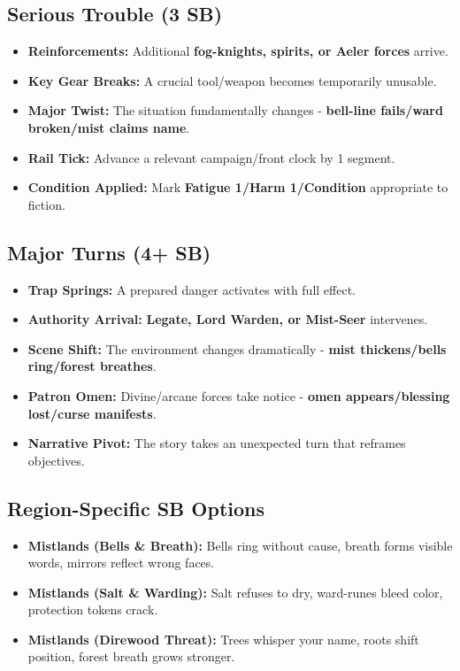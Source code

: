 \subsection*{Serious Trouble (3 SB)}
\begin{itemize}
\item \textbf{Reinforcements:} Additional \textbf{fog-knights, spirits, or Aeler forces} arrive.
\item \textbf{Key Gear Breaks:} A crucial tool/weapon becomes temporarily unusable.
\item \textbf{Major Twist:} The situation fundamentally changes - \textbf{bell-line fails/ward broken/mist claims name}.
\item \textbf{Rail Tick:} Advance a relevant campaign/front clock by 1 segment.
\item \textbf{Condition Applied:} Mark \textbf{Fatigue 1/Harm 1/Condition} appropriate to fiction.
\end{itemize}

\subsection*{Major Turns (4+ SB)}
\begin{itemize}
\item \textbf{Trap Springs:} A prepared danger activates with full effect.
\item \textbf{Authority Arrival:} \textbf{Legate, Lord Warden, or Mist-Seer} intervenes.
\item \textbf{Scene Shift:} The environment changes dramatically - \textbf{mist thickens/bells ring/forest breathes}.
\item \textbf{Patron Omen:} Divine/arcane forces take notice - \textbf{omen appears/blessing lost/curse manifests}.
\item \textbf{Narrative Pivot:} The story takes an unexpected turn that reframes objectives.
\end{itemize}

\subsection*{Region-Specific SB Options}
\begin{itemize}
\item \textbf{Mistlands (Bells \& Breath):} Bells ring without cause, breath forms visible words, mirrors reflect wrong faces.
\item \textbf{Mistlands (Salt \& Warding):} Salt refuses to dry, ward-runes bleed color, protection tokens crack.
\item \textbf{Mistlands (Direwood Threat):} Trees whisper your name, roots shift position, forest breath grows stronger.
\end{itemize}

